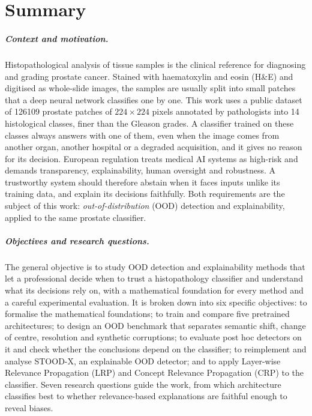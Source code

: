 %

\chapter{Summary}

\paragraph{Context and motivation.} Histopathological analysis of tissue samples is the clinical reference for diagnosing and grading prostate cancer. Stained with haematoxylin and eosin (H\&E) and digitised as whole-slide images, the samples are usually split into small patches that a deep neural network classifies one by one. This work uses a public dataset of \num{126109} prostate patches of $224 \times 224$ pixels annotated by pathologists into 14 histological classes, finer than the Gleason grades. A classifier trained on these classes always answers with one of them, even when the image comes from another organ, another hospital or a degraded acquisition, and it gives no reason for its decision. European regulation treats medical AI systems as high-risk and demands transparency, explainability, human oversight and robustness. A trustworthy system should therefore abstain when it faces inputs unlike its training data, and explain its decisions faithfully. Both requirements are the subject of this work: \emph{out-of-distribution} (OOD) detection and explainability, applied to the same prostate classifier.

\paragraph{Objectives and research questions.} The general objective is to study OOD detection and explainability methods that let a professional decide when to trust a histopathology classifier and understand what its decisions rely on, with a mathematical foundation for every method and a careful experimental evaluation. It is broken down into six specific objectives: to formalise the mathematical foundations; to train and compare five pretrained architectures; to design an OOD benchmark that separates semantic shift, change of centre, resolution and synthetic corruptions; to evaluate post hoc detectors on it and check whether the conclusions depend on the classifier; to reimplement and analyse STOOD-X, an explainable OOD detector; and to apply Layer-wise Relevance Propagation (LRP) and Concept Relevance Propagation (CRP) to the classifier. Seven research questions guide the work, from which architecture classifies best to whether relevance-based explanations are faithful enough to reveal biases.

